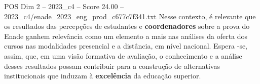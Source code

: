 \begin{textsample}{POS Dim 2 – 2023\_c4 – Score 24.00 – 2023\_c4/enade\_2023\_eng\_prod\_c677c7f341.txt}
Nesse contexto, é relevante que os resultados das percepções de estudantes e \textbf{coordenadores} sobre a prova do Enade ganhem relevância como um elemento a mais nas análises da oferta dos cursos nas modalidades presencial e a distância, em nível nacional.
Espera -se, assim, que, em uma visão formativa de avaliação, o conhecimento e a análise desses resultados possam contribuir para a construção de alternativas institucionais que induzam à \textbf{excelência} da educação superior.

\end{textsample}
